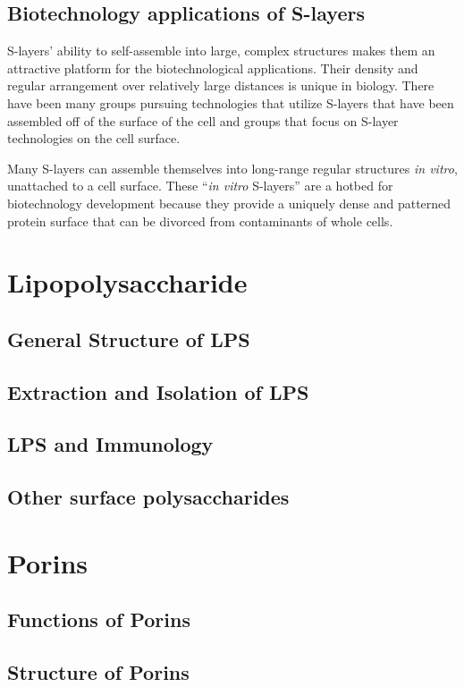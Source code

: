   \subsection{Biotechnology applications of S-layers}\label{sec:biot-appl-s} 
  
  \Acp{S-layer}' ability to self-assemble into large, complex structures makes them  an attractive platform for the biotechnological applications. Their density and regular arrangement over relatively large distances is unique in biology. There have been many groups pursuing technologies that utilize \acp{S-layer} that have been assembled off of the surface of the cell and groups that focus on \ac{S-layer} technologies on the cell surface.
  
Many \acp{S-layer} can assemble themselves into long-range regular structures \textit{in vitro}, unattached to a cell surface. These ``\textit{in vitro} \acp{S-layer}'' are a hotbed for biotechnology development because they provide a uniquely dense and patterned protein surface that can be divorced from contaminants of whole cells. 


  \section{Lipopolysaccharide} \label{sec:intro-lps}
  \subsection{General Structure of LPS}\label{sub:general-structre-lps} 
  \subsection{Extraction and Isolation of LPS} \label{sub:extr-isol-lps}
  \subsection{LPS and Immunology}\label{sub:lps-immuonolgy}
  \subsection{Other surface polysaccharides}\label{sub:other-surf-polysaccharides}
  \section{Porins} \label{sec:intro-porins}   
  \subsection{Functions of Porins}\label{sub:functions-porins}
  \subsection{Structure of Porins}\label{sub:structure-porins}


  
